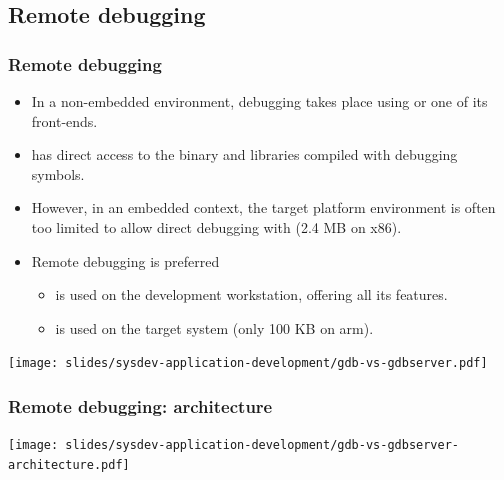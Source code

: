 \subsection{Remote debugging}

\begin{frame}
  \frametitle{Remote debugging}
  \begin{itemize}
  \item In a non-embedded environment, debugging takes place using 
    or one of its front-ends.
  \item {} has direct access to the binary and libraries compiled
    with debugging symbols.
  \item However, in an embedded context, the target platform
    environment is often too limited to allow direct debugging with
     (2.4 MB on x86).
  \item Remote debugging is preferred
    \begin{itemize}
    \item {} is used on the development workstation, offering
      all its features.
    \item {} is used on the target system (only 100 KB
      on arm).
    \end{itemize}
  \end{itemize}
  \begin{center}
    \texttt{[image: slides/sysdev-application-development/gdb-vs-gdbserver.pdf]}
  \end{center}
\end{frame}

\begin{frame}
  \frametitle{Remote debugging: architecture}
  \begin{center}
    \texttt{[image: slides/sysdev-application-development/gdb-vs-gdbserver-architecture.pdf]}
  \end{center}
\end{frame}

